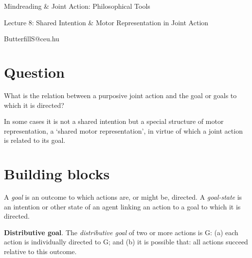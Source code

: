 \documentclass[11pt]{extarticle}
\date{}
\begin{document}
\begin{multicols}{3}

\setlength\footnotesep{1em}









\begin{center}
{\Large
Mindreading \& Joint Action: Philosophical Tools}

Lecture 8: Shared Intention \& Motor Representation in Joint Action


ButterfillS@ceu.hu
\end{center}



\section{Question}
What is the relation between a purposive joint action and the goal or goals to which it is directed?

In some cases 
	it is not a shared intention 
	but a special structure of motor representation,
	a `shared motor representation',
	in virtue of which a joint action is related to its goal.


\section{Building blocks}

A \emph{goal} is an outcome to which actions are, or might be, directed.  A \emph{goal-state} is an intention or other state of an agent linking an action to a goal to which it is directed.

%
%

\textbf{Distributive goal}.  The \emph{distributive goal} of two or more actions is G: (a) each action is individually directed to G; and (b) it is possible that: all actions succeed relative to this outcome.


\end{multicols}
\end{document}
